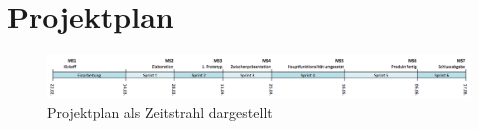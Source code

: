 
\section{Projektplan}
\begin{figure}[H]
	\centering
	\includegraphics[width=\textwidth]{images/projektmanagement/zeitstrahl.png}
	\caption{Projektplan als Zeitstrahl dargestellt}
	\label{image-project-plan-timeline}
\end{figure}



